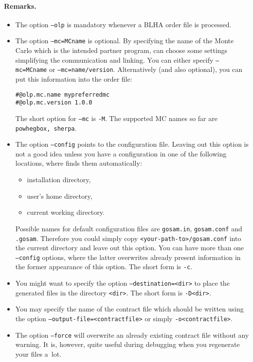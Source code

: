 \paragraph{Remarks.}
\begin{itemize}
\item The option \texttt{--olp} is mandatory whenever 
   a BLHA order file is processed.
\item The option \texttt{--mc=MCname} is optional. By specifying the
   name of the Monte Carlo which is the intended partner program,
   \gosam{} can choose some settings simplifying the communication and linking.
   You can either specify \texttt{--mc=MCname} or \texttt{--mc=name/version}.
   Alternatively (and also optional),
   you can put this information into the order file:
\begin{lstlisting}
#@olp.mc.name mypreferredmc
#@olp.mc.version 1.0.0
\end{lstlisting}
   The short option for \texttt{--mc} is \texttt{-M}.
   The supported MC names so far are {\tt powhegbox, sherpa}.
\item The option \texttt{--config} points to the configuration file.
   Leaving out this option is not a good idea unless you have a configuration
   in one of the following locations, where \gosam{} finds them automatically:
   \begin{itemize}
   \item \gosam{} installation directory,
   \item user's home directory,
   \item current working directory.
   \end{itemize}
   Possible names for default configuration files are \texttt{gosam.in},
   \texttt{gosam.conf} and \texttt{.gosam}. Therefore you could simply copy
   \texttt{<your-path-to>/\hspace{0pt}gosam.conf}
   into the current directory and leave out this option.
   You can have more than one \texttt{--config} options, where the latter
   overwrites already present information in the former appearance of this
   option. The short form is \texttt{-c}.
\item You might want to specify the option \texttt{--destination=<dir>}
   to place the generated files in the directory \texttt{<dir>}.
   The short form is \texttt{-D<dir>}.
\item You may specify the name of the contract file which should be written
   using the option \texttt{--output-file=<contractfile>} or simply
   \texttt{-o<contractfile>}.
\item The option \texttt{--force} will overwrite an already existing
   contract file without any warning. It is, however, quite useful during
   debugging when you regenerate your files a~lot.
\end{itemize}

